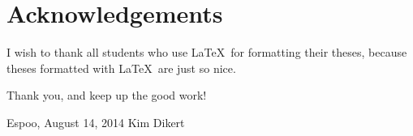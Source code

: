 \documentclass[12pt,a4paper,oneside,pdftex]{report}
\newcommand{\DATE}{August 14, 2014}
\newcommand{\AUTHOR}{Kim Dikert}
\begin{document}
\chapter*{Acknowledgements}

I wish to thank all students who use \LaTeX\ for formatting their theses,
because theses formatted with \LaTeX\ are just so nice.

Thank you, and keep up the good work!
\vskip 10mm

\noindent Espoo, \DATE
\vskip 5mm
\noindent\AUTHOR


% 


\cleardoublepage
\tableofcontents

\cleardoublepage
\listoftables


\label{pages-prelude}
\cleardoublepage

\startfirstchapter

\pagestyle{headings}
\end{document}
